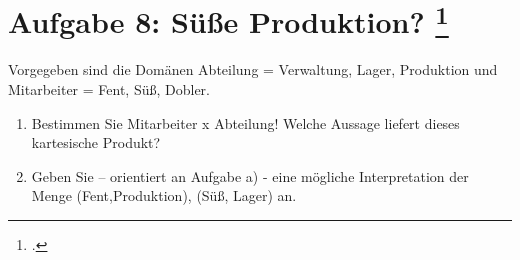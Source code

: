 \documentclass{bschlangaul-aufgabe}
\begin{document}

\section{Aufgabe 8: Süße Produktion?
\footcite{db:ab:klausurvorbereitung}}

Vorgegeben sind die Domänen Abteilung = Verwaltung, Lager, Produktion
und Mitarbeiter = Fent, Süß, Dobler.

\begin{enumerate}


\item Bestimmen Sie Mitarbeiter x Abteilung! Welche Aussage liefert
dieses kartesische Produkt?


\item Geben Sie – orientiert an Aufgabe a) - eine mögliche
Interpretation der Menge (Fent,Produktion), (Süß, Lager) an.

\end{enumerate}
\end{document}
